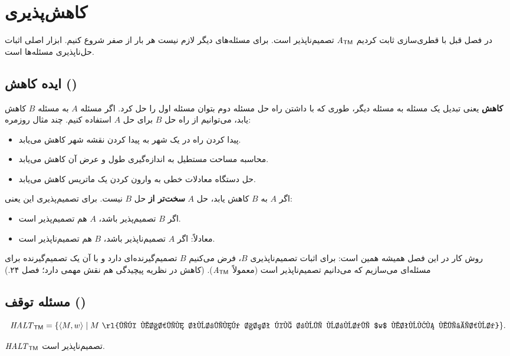 \chapter{کاهش‌پذیری}

در فصل قبل با قطری‌سازی ثابت کردیم $\mathit{A}_{\mathsf{TM}}$ تصمیم‌ناپذیر است. برای مسئله‌های دیگر لازم نیست هر بار از صفر شروع کنیم. ابزار اصلی اثبات حل‌ناپذیری مسئله‌ها  است.

\section{ایده کاهش ()}

\textbf{کاهش} یعنی تبدیل یک مسئله به مسئله دیگر، طوری که با داشتن راه حل مسئله دوم بتوان مسئله اول را حل کرد. اگر مسئله $A$ به مسئله $B$ کاهش یابد، می‌توانیم از راه حل $B$ برای حل $A$ استفاده کنیم. چند مثال روزمره:
\begin{itemize}
\item پیدا کردن راه در یک شهر به پیدا کردن نقشه شهر کاهش می‌یابد.
\item محاسبه مساحت مستطیل به اندازه‌گیری طول و عرض آن کاهش می‌یابد.
\item حل دستگاه معادلات خطی به وارون کردن یک ماتریس کاهش می‌یابد.
\end{itemize}

اگر $A$ به $B$ کاهش یابد، حل $A$ \textbf{سخت‌تر از} حل $B$ نیست. برای تصمیم‌پذیری این یعنی:
\begin{itemize}
\item اگر $B$ تصمیم‌پذیر باشد، $A$ هم تصمیم‌پذیر است.
\item معادلاً: اگر $A$ تصمیم‌ناپذیر باشد، $B$ هم تصمیم‌ناپذیر است.
\end{itemize}
روش کار در این فصل همیشه همین است: برای اثبات تصمیم‌ناپذیری $B$، فرض می‌کنیم $B$ تصمیم‌گیرنده‌ای دارد و با آن یک تصمیم‌گیرنده برای مسئله‌ای می‌سازیم که می‌دانیم تصمیم‌ناپذیر است (معمولاً $\mathit{A}_{\mathsf{TM}}$). (کاهش در نظریه پیچیدگی هم نقش مهمی دارد؛ فصل ۲۴.)

\section{مسئله توقف ()}

\[\lng{HALT}{TM}=\{\enc{M,w}\st M\ \text{\rl{یک ماشین تورینگ است که روی ورودی $w$ متوقف می‌شود}}\}.\]

\begin{theorem}
$\mathit{HALT}_{\mathsf{TM}}$ تصمیم‌ناپذیر است.
\end{theorem}

